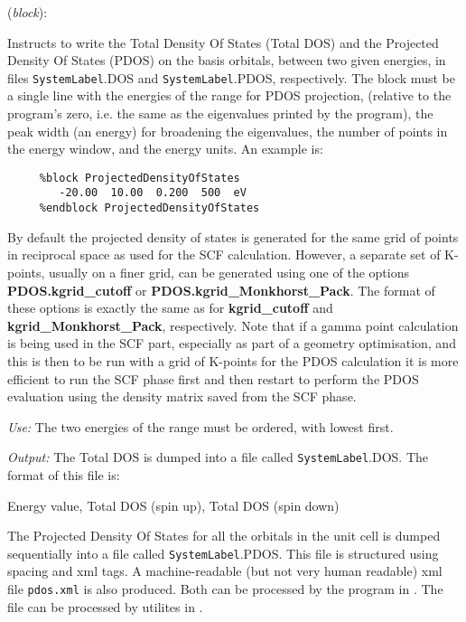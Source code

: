 \begin{description}
\itemsep 10pt
\parsep 0pt
\item[\textbf{ProjectedDensityOfStates}] (\textit{block}):

Instructs to write the Total Density Of States (Total DOS) and the
Projected Density Of States (PDOS) on the basis orbitals,
between two given energies,
in files \texttt{SystemLabel}.DOS and
\texttt{SystemLabel}.PDOS, respectively.
The block must be a single line with the energies of the range for
PDOS projection,
(relative to the program's zero, i.e. the same as the eigenvalues
printed by the program), the peak width (an energy) for broadening
the eigenvalues, the number of points in the energy window,
and the energy units.
An example is:

\begin{verbatim}
     %block ProjectedDensityOfStates
        -20.00  10.00  0.200  500  eV
     %endblock ProjectedDensityOfStates
\end{verbatim}

By default the projected density of states is generated for the same
grid of points in reciprocal space as used for the SCF calculation.
However, a separate set of K-points, usually on a finer grid, can
be generated using one of the options \textbf{PDOS.kgrid\_cutoff} or
\textbf{PDOS.kgrid\_Monkhorst\_Pack}. The format of these options is
exactly the same as for \textbf{kgrid\_cutoff} and
\textbf{kgrid\_Monkhorst\_Pack}, respectively. Note that if a gamma
point calculation is being used in the SCF part, especially as part
of a geometry optimisation, and this is then to
be run with a grid of K-points for the PDOS calculation it is more
efficient to run the SCF phase first and then restart to perform the
PDOS evaluation using the density matrix saved from the SCF phase.

\textit{Use:} The two energies of the range must be ordered, with lowest
first.

\textit{Output:} The Total DOS is dumped into a file
called \texttt{SystemLabel}.DOS. The format of this file is:

Energy value, Total DOS (spin up), Total DOS (spin down)

The Projected Density Of States for all the orbitals in the unit cell
is dumped sequentially into a file called
\texttt{SystemLabel}.PDOS. This file is structured using spacing and
xml tags. A machine-readable (but not very human readable) xml file
\texttt{pdos.xml} is also produced. Both can be processed by the
program in . The  file can be
processed by utilites in .


\end{description}
